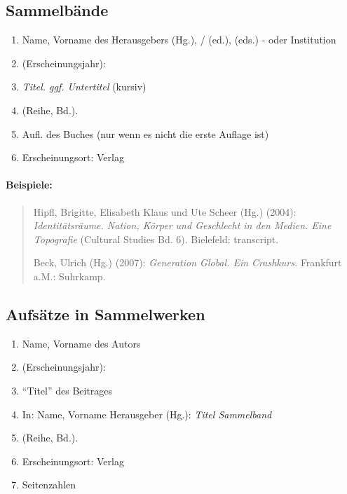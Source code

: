 \documentclass[ 12pt,
                titlepage,
                parskip=half,
                version=first,
                bibliography=totocnumbered,
                final,
                listof=totoc]{scrartcl}
\begin{document}
\subsection{Sammelbände}
\label{sec:sub_sammelbände}

\begin{samepage}
\begin{enumerate}
    \item Name, Vorname des Herausgebers (Hg.), / (ed.), (eds.) - oder
    Institution
    \item (Erscheinungsjahr):
    \item \emph{Titel. ggf. Untertitel} (kursiv)
    \item (Reihe, Bd.).
    \item Aufl. des Buches (nur wenn es nicht die erste Auflage ist)
    \item Erscheinungsort: Verlag
\end{enumerate}
\end{samepage}

\paragraph{Beispiele:}
\begin{quote}
Hipfl, Brigitte, Elisabeth Klaus und Ute Scheer (Hg.) (2004):
\emph{Identitätsräume. Nation, Körper und Geschlecht in den Medien. Eine
Topografie} (Cultural Studies Bd. 6). Bielefeld: transcript.

Beck, Ulrich (Hg.) (2007): \emph{Generation Global. Ein Crashkurs.} Frankfurt
a.M.: Suhrkamp.
\end{quote}

\subsection{Aufsätze in Sammelwerken}
\label{sec:sub_aufsätze_in_sammelwerken}

\begin{enumerate}
    \item Name, Vorname des Autors
    \item (Erscheinungsjahr):
    \item \enquote{Titel} des Beitrages
    \item In: Name, Vorname Herausgeber (Hg.): \emph{Titel Sammelband}
    \item (Reihe, Bd.).
    \item Erscheinungsort: Verlag
    \item Seitenzahlen
\end{enumerate}
\end{document}
